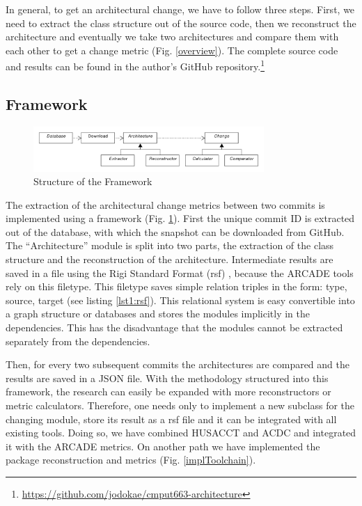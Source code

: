 \documentclass[conference]{IEEEtran}
\begin{document}
In general, to get an architectural change, we have to follow three steps. First, we need to extract the class structure out of the source code, then we reconstruct the architecture and eventually we take two architectures and compare them with each other to get a change metric (Fig. \ref{overview}). The complete source code and results can be found in the author's GitHub repository.\footnote{\url{https://github.com/jodokae/cmput663-architecture}}

\subsection{Framework}

\begin{figure}[!t]
	\centering
	\includegraphics[width=3.45in]{assets/architecture.pdf}
	\caption{Structure of the Framework}
	\label{frameworkStructure}
\end{figure}

The extraction of the architectural change metrics between two commits is implemented using a framework (Fig. \ref{frameworkStructure}). First the unique commit ID is extracted out of the database, with which the snapshot can be downloaded from GitHub. 
The ``Architecture'' module is split into two parts, the extraction of the class structure and the reconstruction of the architecture. Intermediate results are saved in a file using the Rigi Standard Format (rsf) \cite{RSF}, because the ARCADE tools rely on this filetype. This filetype saves simple relation triples in the form: type, source, target (see listing \ref{lst1:rsf}). This relational system is easy convertible into a graph structure or databases and stores the modules implicitly in the dependencies. This has the disadvantage that the modules cannot be extracted separately from the dependencies.

Then, for every two subsequent commits the architectures are compared and the results are saved in a JSON file. With the methodology structured into this framework, the research can easily be expanded with more reconstructors or metric calculators. Therefore, one needs only to implement a new subclass for the changing module, store its result as a rsf file and it can be integrated with all existing tools. Doing so, we have combined HUSACCT and ACDC and integrated it with the ARCADE metrics. On another path we have implemented the package reconstruction and metrics (Fig. \ref{implToolchain}).
\end{document}
